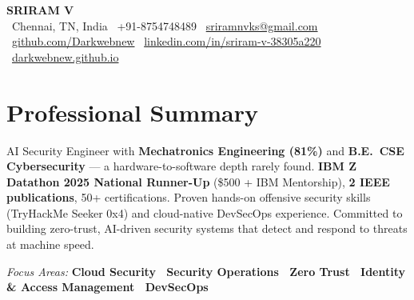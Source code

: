 \documentclass[9.5pt, letterpaper]{article}
\begin{document}

\begin{center}
  {\Large\bfseries\color{accent} SRIRAM V}\\[3pt]
  {\small
    \faMapMarker\ Chennai, TN, India \enspace
    \faPhone\ +91-8754748489 \enspace
    \faEnvelope\ \href{mailto:sriramnvks@gmail.com}{sriramnvks@gmail.com}\\[2pt]
    \faGithub\ \href{https://github.com/Darkwebnew}{github.com/Darkwebnew} \enspace
    \faLinkedin\ \href{https://linkedin.com/in/sriram-v-38305a220}{linkedin.com/in/sriram-v-38305a220} \enspace
    \faGlobe\ \href{https://darkwebnew.github.io}{darkwebnew.github.io}
  }
\end{center}
\vspace{-2pt}

\section{Professional Summary}
\vspace{1pt}
AI Security Engineer with \textbf{Mechatronics Engineering (81\%)} and \textbf{B.E.\ CSE Cybersecurity} — a hardware-to-software depth rarely found. \textbf{IBM Z Datathon 2025 National Runner-Up} (\$500 + IBM Mentorship), \textbf{2 IEEE publications}, 50+ certifications. Proven hands-on offensive security skills (TryHackMe Seeker 0x4) and cloud-native DevSecOps experience. Committed to building zero-trust, AI-driven security systems that detect and respond to threats at machine speed.

\vspace{2pt}
\textit{Focus Areas:} \textbf{Cloud Security \textperiodcentered\ Security Operations \textperiodcentered\ Zero Trust \textperiodcentered\ Identity \& Access Management \textperiodcentered\ DevSecOps}

\end{document}
